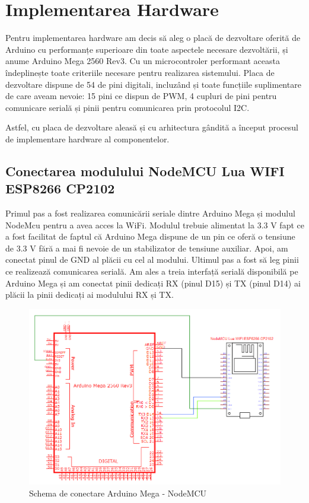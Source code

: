 \chapter{Implementarea Hardware}
\thispagestyle{pagestyle}

Pentru implementarea hardware am decis să aleg o placă de dezvoltare oferită de Arduino cu performanțe superioare din toate aspectele necesare dezvoltării, și anume Arduino Mega 2560 Rev3. Cu un microcontroler performant aceasta îndeplinește toate criteriile necesare pentru realizarea sistemului. Placa de dezvoltare dispune de 54 de pini digitali, incluzând și toate funcțiile suplimentare de care aveam nevoie: 15 pini ce dispun de PWM, 4 cupluri de pini pentru comunicare serială și pinii pentru comunicarea prin protocolul I2C\cite{mega_datasheet}.

Astfel, cu placa de dezvoltare aleasă și cu arhitectura gândită a început procesul de implementare hardware al componentelor.

\section{Conectarea modulului NodeMCU Lua WIFI ESP8266 CP2102}
Primul pas a fost realizarea comunicării seriale dintre Arduino Mega și modulul NodeMcu pentru a avea acces la WiFi. Modulul trebuie alimentat la 3.3 V fapt ce a fost facilitat de faptul că Arduino Mega dispune de un pin ce oferă o tensiune de 3.3 V fără a mai fi nevoie de un stabilizator de tensiune auxiliar. Apoi, am conectat pinul de GND al plăcii cu cel al modului. Ultimul pas a fost să leg pinii ce realizează comunicarea serială. Am ales a treia interfață serială disponibilă pe Arduino Mega și am conectat pinii dedicați RX (pinul D15) și TX (pinul D14) ai plăcii la pinii dedicați ai modulului RX și TX.
\begin{figure}[H]
\includegraphics[width=0.9\linewidth]{bachelors_ro/images/conexiune_mega_esp.png}
\caption{Schema de conectare Arduino Mega - NodeMCU}
\label{fig:conexiune_mega_esp}
\end{figure}

